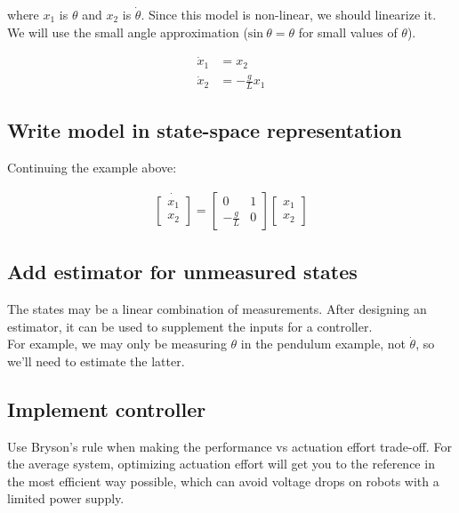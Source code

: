 \documentclass[10pt,conference,compsoc]{IEEEtran}
\begin{document}
\noindent where $x_1$ is $\theta$ and $x_2$ is $\dot{\theta}$. Since this model
is non-linear, we should linearize it. We will use the small angle approximation
($\mathrm{sin}~\theta = \theta$ for small values of $\theta$).

\begin{align*}
  \dot{x}_1 &= x_2 \\
  \dot{x}_2 &= -\frac{g}{L} x_1
\end{align*}

\subsection{Write model in state-space representation}

\noindent Continuing the example above:

\begin{align}
  \dot{\left[
  \begin{array}{c}
    x_1 \\
    x_2
  \end{array} \right]} = \left[
  \begin{array}{cc}
    0 & 1 \\
    -\frac{g}{L} & 0
  \end{array} \right] \left[
  \begin{array}{c}
    x_1 \\
    x_2
  \end{array} \right]
\end{align}

\subsection{Add estimator for unmeasured states}

\noindent The states may be a linear combination of measurements. After
designing an estimator, it can be used to supplement the inputs for a
controller. \\

\noindent For example, we may only be measuring $\theta$ in the pendulum
example, not $\dot{\theta}$, so we'll need to estimate the latter.

\subsection{Implement controller}

\noindent Use Bryson's rule when making the performance vs actuation effort
trade-off. For the average system, optimizing actuation effort will get you to
the reference in the most efficient way possible, which can avoid voltage drops
on robots with a limited power supply.
\end{document}
